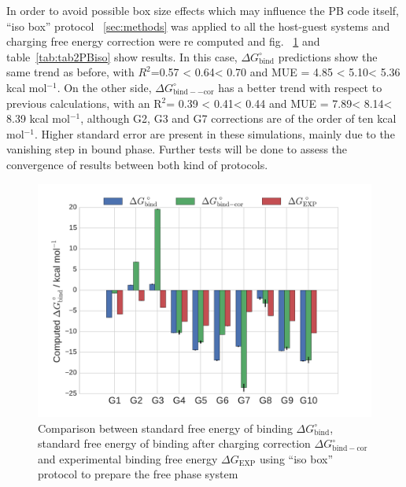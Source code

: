 \documentclass[11pt,oneside,a4paper]{article}
\begin{document}
In order to avoid possible box size effects which may influence the PB code itself, ``iso box'' protocol ~\ref{sec:methods} was applied to all the host-guest systems and charging free energy correction were re computed and fig. ~\ref{fig:fig2} and table~\ref{tab:tab2PBiso} show results. In this case, $\Delta G_\mathrm{bind}^\circ$ predictions show the same trend as before, with $R^2$=0.57 < 0.64< 0.70 and MUE = 4.85 < 5.10< 5.36 kcal mol$^{-1}$. On the other side, $\Delta G_\mathrm{bind--cor}^\circ$ has a better trend with respect to previous calculations, with an R$^2$= 0.39 < 0.41< 0.44 and MUE = 7.89< 8.14< 8.39 kcal mol$^{-1}$, although G2, G3 and G7 corrections are of the order of ten kcal mol$^{-1}$.
Higher standard error are present in these simulations, mainly due to the vanishing step in bound phase. Further tests will be done to assess the convergence of results between both kind of protocols.


\newpage
\begin{figure}[h!]
\caption{Comparison between standard free energy of binding $\Delta G_\mathrm{bind}^\circ$, standard free energy of binding after charging correction $\Delta G_\mathrm{bind-cor}^\circ$ and experimental binding free energy $\Delta G_\mathrm{EXP}$ using ``iso box'' protocol to prepare the free phase system \label{fig:fig2}}
 \includegraphics[width=\textwidth]{figures/Fig2.pdf}
 \centering
\end{figure}
\end{document}
